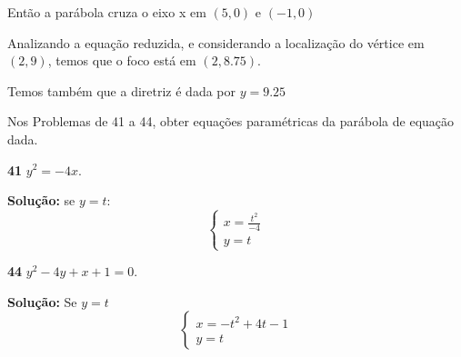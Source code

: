 Então a parábola cruza o eixo x em $(5, 0)$ e $(-1, 0)$

Analizando a equação reduzida, e considerando a localização do vértice em $(2, 9)$, temos que o foco está em $(2, 8.75)$.

Temos também que a diretriz é dada por $y = 9.25$

Nos Problemas de 41 a 44, obter equações paramétricas da parábola de equação dada.

\textbf{41} $y^2 = -4x$.

\textbf{Solução:} se $y = t$:
\begin{equation}
    \left\{
        \begin{split}
            x = \frac{t^2}{-4} \\
            y = t
        \end{split}
    \right.
\end{equation}

\textbf{44} $y^2 -4y + x + 1 = 0$.

\textbf{Solução:} Se $y = t$
\begin{equation}
    \left\{
        \begin{split}
            x = -t^2 + 4t - 1 \\
            y = t
        \end{split}
    \right.
\end{equation}